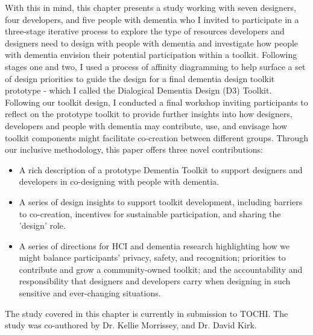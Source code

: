 With this in mind, this chapter presents a study working with seven designers, four developers, and five people with dementia who I invited to participate in a three-stage iterative process to explore the type of resources developers and designers need to design with people with dementia and investigate how people with dementia envision their potential participation within a toolkit. Following stages one and two, I used a process of affinity diagramming to help surface a set of design priorities to guide the design for a final dementia design toolkit prototype - which I called the Dialogical Dementia Design (D3) Toolkit. Following our toolkit design, I conducted a final workshop inviting participants to reflect on the prototype toolkit to provide further insights into how designers, developers and people with dementia may contribute, use, and envisage how toolkit components might facilitate co-creation between different groups. Through our inclusive methodology, this paper offers three novel contributions:
\begin{itemize}
    \item  A rich description of a prototype Dementia Toolkit to support designers and developers in co-designing with people with dementia.
    \item  A series of design insights to support toolkit development, including barriers to co-creation, incentives for sustainable participation, and sharing the 'design' role.
    \item A series of directions for HCI and dementia research highlighting how we might balance participants' privacy, safety, and recognition; priorities to contribute and grow a community-owned toolkit; and the accountability and responsibility that designers and developers carry when designing in such sensitive and ever-changing situations.
\end{itemize}

The study covered in this chapter is currently in submission to TOCHI. The study was co-authored by Dr. Kellie Morrissey, and Dr. David Kirk.


